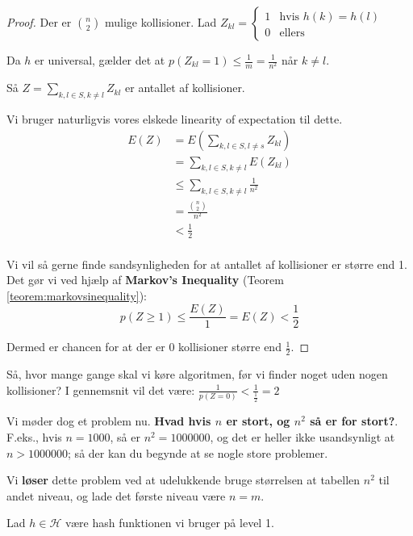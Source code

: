 \documentclass[11pt]{article}
\theoremstyle{definition}
\theoremstyle{remark}
\begin{document}
\begin{proof}

  Der er $\binom{n}{2}$ mulige kollisioner.
  Lad $Z_{kl} = \begin{cases} 1 &\text{hvis } h(k) = h(l) \\ 0 &\text{ellers} \end{cases}$

  Da $h$ er universal, gælder det at $p(Z_{kl} = 1) \leq \frac{1}{m} = \frac{1}{n^{2}}$ når $k \neq l$.

  Så $Z = \sum_{k, l \in S, k \neq l}^{}Z_{kl}$ er antallet af kollisioner.

  Vi bruger naturligvis vores elskede linearity of expectation til dette.
  \begin{equation}
    \begin{split}
      E(Z) &= E(\sum_{k, l \in S, l \neq s}^{}Z_{kl})\\
           &= \sum_{k,l \in S, k \neq l}^{} E(Z_{kl}) \\
           &\leq \sum_{k, l \in S, k \neq l}^{} \frac{1}{n^{2}}\\
           &= \frac{\binom{n}{2}}{n^{2}}\\
      &< \frac{1}{2}\\
    \end{split}
  \end{equation}

  Vi vil så gerne finde sandsynligheden for at antallet af kollisioner er større end 1. Det gør vi ved hjælp af \textbf{Markov's Inequality} (Teorem \ref{teorem:markovsinequality}):
  \[ p(Z \geq 1) \leq \frac{E(Z)}{1} = E(Z) < \frac{1}{2} \]

  Dermed er chancen for at der er 0 kollisioner større end $\frac{1}{2}$.
\end{proof}

Så, hvor mange gange skal vi køre algoritmen, før vi finder noget uden nogen kollisioner? I gennemsnit vil det være: $\frac{1}{p(Z=0)} < \frac{1}{\frac{1}{2}} = 2$

Vi møder dog et problem nu. \textbf{Hvad hvis $n$ er stort, og $n^{2}$ så er for stort?}. F.eks., hvis $n = 1000$, så er $n^{2} = 1 000 000$, og det er heller ikke usandsynligt at $n > 1 000 000$; så der kan du begynde at se nogle store problemer.

Vi \textbf{løser} dette problem ved at udelukkende bruge størrelsen at tabellen $n^2$ til andet niveau, og lade det første niveau være $n = m$.

Lad $h \in \mathcal{H}$ være hash funktionen vi bruger på level 1.
\end{document}
